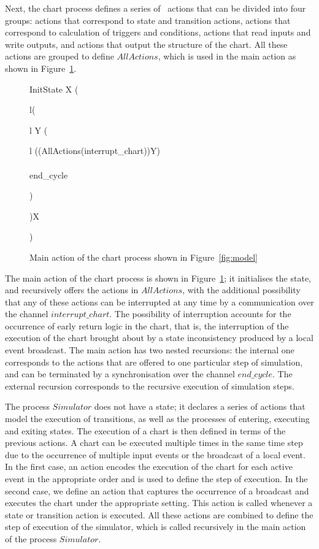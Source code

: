 \documentclass[submission]{eptcs}
\renewcommand{\circblockbegin}{\left(\begin{array}{l}}
\renewcommand{\circblockend}{\end{array}\right)}
\begin{document}
Next, the chart process defines a series of \Circus~actions that can be divided into four groups: actions that correspond to state and transition actions, actions that correspond to calculation of triggers and conditions, actions that read inputs and write outputs, and actions that output the structure of the chart.
All these actions are grouped to define $AllActions$, which is used in the main action as shown in Figure~\ref{fig:chart-main-action}.

\begin{figure}
\centering
\hspace{-.8cm}
\begin{minipage}{\textwidth}
\begin{circus}
\circspot \lschexpract InitState \rschexpract \circseq
\circmu X \circspot \circblockbegin\circblockbegin
\circmu Y \circspot
\circblockbegin
((AllActions\circinterrupt(interrupt\_chart\then\Skip))\circseq Y)\\
\extchoice\\
end\_cycle\then\Skip
\circblockend
\circblockend\circseq X\circblockend\\
\circend
\end{circus}
\end{minipage}
\caption{Main action of the chart process shown in Figure~\ref{fig:model}}
\label{fig:chart-main-action}
\end{figure}

The main action of the chart process is shown in Figure~\ref{fig:chart-main-action}; it initialises the state, and recursively offers the actions in $AllActions$, with the additional possibility that any of these actions can be interrupted at any time by a communication over the channel $interrupt\_chart$. The possibility of interruption accounts for the occurrence of early return logic in the chart, that is, the interruption of the execution of the chart brought about by a state inconsistency produced by a local event broadcast. The main action has two nested recursions: the internal one corresponds to the actions that are offered to one particular step of simulation, and can be terminated by a synchronisation over the channel $end\_cycle$. The external recursion corresponds to the recursive execution of simulation steps.

The process $Simulator$ does not have a state; it declares a series of actions that model the execution of transitions, as well as the processes of entering, executing and exiting states. The execution of a chart is then defined in terms of the previous actions. A chart can be executed multiple times in the same time step due to the occurrence of multiple input events or the broadcast of a local event. In the first case, an action encodes the execution of the chart for each active event in the appropriate order and is used to define the step of execution. In the second case, we define an action that captures the occurrence of a broadcast and executes the chart under the appropriate setting. This action is called whenever a state or transition action is executed.
All these actions are combined to define the step of execution of the simulator, which is called recursively in the main action of the process $Simulator$.
\end{document}
